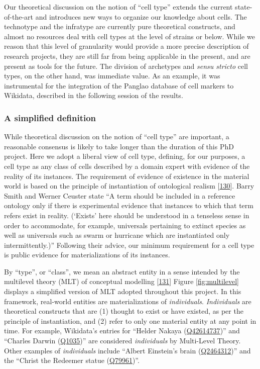 Our theoretical discussion on the notion of ``cell type'' extends the current state-of-the-art and introduces new ways to organize our knowledge about cells.
The technotype and the infratype are currently pure theoretical constructs, and almost no resources deal with cell types at the level of strains or below.
While we reason that this level of granularity would provide a more precise description of research projects, they are still far from being applicable in the present, and are present as tools for the future.
The division of archetypes and \emph{sensu stricto} cell types, on the other hand, was immediate value.
As an example, it was instrumental for the integration of the Panglao database of cell markers to Wikidata, described in the following session of the results.

\hypertarget{a-simplified-definition}{%
\subsubsection{A simplified definition}\label{a-simplified-definition}}

While theoretical discussion on the notion of ``cell type'' are important, a reasonable consensus is likely to take longer than the duration of this PhD project.
Here we adopt a liberal view of cell type, defining, for our purposes, a cell type as any class of cells described by a domain expert with evidence of the reality of its instances.
The requirement of evidence of existence in the material world is based on the principle of instantiation of ontological realism {[}\protect\hyperlink{ref-5ZFRyTy5}{130}{]}. Barry Smith and Werner Ceuster state ``A term should be included in a reference ontology only if there is experimental evidence that instances to which that term refers exist in reality. (`Exists' here should be understood in a tenseless sense in order to accommodate, for example, universals pertaining to extinct species as well as universals such as swarm or hurricane which are instantiated only intermittently.)''
Following their advice, our minimum requirement for a cell type is public evidence for materializations of its instances.

By ``type'', or ``class'', we mean an abstract entity in a sense intended by the multilevel theory (MLT) of conceptual modelling {[}\protect\hyperlink{ref-eP47FILn}{131}{]}
Figure \ref{fig:multilevel} displays a simplified version of MLT adopted throughout this project.
In this framework, real-world entities are materializations of \emph{individuals}.
\emph{Individuals} are theoretical constructs that are (1) thought to exist or have existed, as per the principle of instantiation, and (2) refer to only one material entity at any point in time.
For example, Wikidata's entries for ``Helder Nakaya (\href{https://www.wikidata.org/wiki/Q42614737}{Q42614737})'' and ``Charles Darwin (\href{https://www.wikidata.org/wiki/Q42614737}{Q1035})'' are considered \emph{individuals} by Multi-Level Theory.
Other examples of \emph{individuals} include ``Albert Einstein's brain (\href{https://www.wikidata.org/wiki/Q2464312}{Q2464312})'' and the ``Christ the Redeemer statue (\href{https://www.wikidata.org/wiki/Q79961}{Q79961})''.

